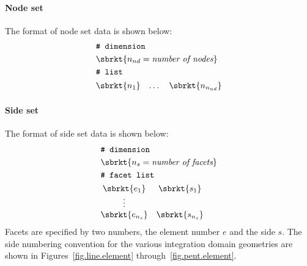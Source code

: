 \paragraph{Node set}
\label{sect.TahoeI.nodeset}
The format of node set data is shown below:
\begin{align}
& \texttt{\# dimension} \notag \\
& \sbrkt{n_{nd} = \textit{number of nodes}} \notag \\
& \texttt{\# list} \notag \\
& \begin{matrix}
\sbrkt{n_{1}} & \dots  & \sbrkt{n_{n_{nd}}} \\
\end{matrix} \notag
\end{align}

\paragraph{Side set}
\label{sect.TahoeI.sideset}
The format of side set data is shown below:
\begin{align}
& \texttt{\# dimension} \notag \\
& \sbrkt{n_{s} = \textit{number of facets}} \notag \\
& \texttt{\# facet list} \notag \\
& \begin{matrix}
\sbrkt{e_{1}} & \sbrkt{s_{1}} \\
\vdots \\
\sbrkt{e_{n_{s}}} & \sbrkt{s_{n_{s}}}
\end{matrix} \notag
\end{align}
Facets are specified by two numbers, the element number $e$ and the
side $s$. The side numbering convention for the various integration 
domain geometries are shown in Figures~\ref{fig.line.element} 
through~\ref{fig.pent.element}.

